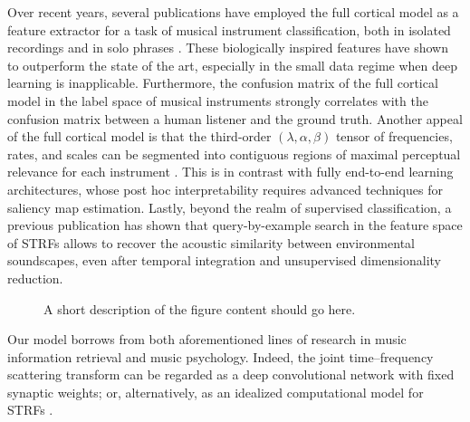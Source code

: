\documentclass{bmcart}
\begin{document}
Over recent years, several publications have employed the full cortical model as a feature extractor for a task of musical instrument classification, both in isolated recordings \cite{patil2012ploscompbiol} and in solo phrases \cite{patil2015eurasip}.
These biologically inspired features have shown to outperform the state of the art, especially in the small data regime when deep learning is inapplicable. %
Furthermore, the confusion matrix of the full cortical model in the label space of musical instruments strongly correlates with the confusion matrix between a human listener and the ground truth.
Another appeal of the full cortical model is that the third-order $(\lambda, \alpha, \beta)$ tensor of frequencies, rates, and scales can be segmented into contiguous regions of maximal perceptual relevance for each instrument \cite{thoret2016jasa}.
This is in contrast with fully end-to-end learning architectures, whose post hoc interpretability requires advanced techniques for saliency map estimation. %
Lastly, beyond the realm of supervised classification, a previous publication \cite{hemery2015frontiers} has shown that query-by-example search in the feature space of STRFs allows to recover the acoustic similarity between environmental soundscapes, even after temporal integration and unsupervised dimensionality reduction.





\begin{figure}[h!]
\caption{
A short description of the figure content should go here.}
\end{figure}


Our model borrows from both aforementioned lines of research in music information retrieval and music psychology.
Indeed, the joint time--frequency scattering transform can be regarded as a deep convolutional network with fixed synaptic weights; or, alternatively, as an idealized computational model for STRFs \cite{anden2019joint}.
\end{document}
